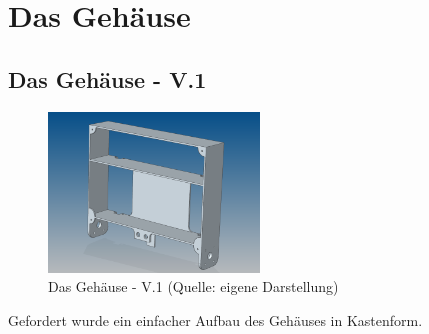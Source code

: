 \newpage
\renewcommand{\autoren}{Valentyn Chepil}
\section{Das Gehäuse}
\subsection{Das Gehäuse - V.1}
\begin{figure}[!h]  %
	\centering\includegraphics[width=0.5\textwidth]{images/gehaeuse-v1.png}
	\caption{Das Gehäuse - V.1 \newline (Quelle: eigene Darstellung)}
	\label{gehaeuse-v1} %
\end{figure}
Gefordert wurde ein einfacher Aufbau des Gehäuses in Kastenform.

